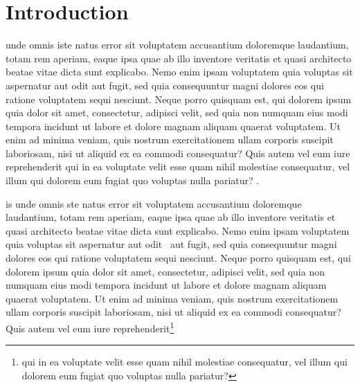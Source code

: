 \section{Introduction}
\label{sec:introduction}

 unde omnis iste natus error sit voluptatem accusantium doloremque laudantium, totam rem aperiam, eaque ipsa quae ab illo inventore veritatis et quasi architecto beatae vitae dicta sunt explicabo. Nemo enim ipsam voluptatem quia voluptas sit aspernatur aut odit aut fugit, sed quia consequuntur magni dolores eos qui ratione voluptatem sequi nesciunt. Neque porro quisquam est, qui dolorem ipsum quia dolor sit amet, consectetur, adipisci velit, sed quia non numquam eius modi tempora incidunt ut labore et dolore magnam aliquam quaerat voluptatem. Ut enim ad minima veniam, quis nostrum exercitationem ullam corporis suscipit laboriosam, nisi ut aliquid ex ea commodi consequatur? Quis autem vel eum iure reprehenderit qui in ea voluptate velit esse quam nihil molestiae consequatur, vel illum qui dolorem eum fugiat quo voluptas nulla pariatur? \cite{Gunawi:2008:SDF:1855741.1855751,
Sigurbjarnarson:2016:PVF:3026877.3026879,
Bairavasundaram:2006:LTS:1179559.1179569,
Gunawi:2008:EEH:1364813.1364827}.


is unde omnis ste natus error sit voluptatem
accusantium doloremque laudantium, totam rem aperiam, eaque ipsa quae
ab illo inventore veritatis et quasi architecto beatae vitae dicta
sunt explicabo. Nemo enim ipsam voluptatem quia voluptas sit
aspernatur aut odit~\cite{corfu} aut fugit, sed quia consequuntur magni dolores eos
qui ratione voluptatem sequi nesciunt. Neque porro quisquam est, qui
dolorem ipsum quia dolor sit amet, consectetur, adipisci velit, sed
quia non numquam eius modi tempora incidunt ut labore et dolore magnam
aliquam quaerat voluptatem. Ut enim ad minima veniam, quis nostrum
exercitationem ullam corporis suscipit laboriosam, nisi ut aliquid ex
ea commodi consequatur? Quis autem vel eum iure
reprehenderit\footnote{qui in ea voluptate velit esse quam nihil
  molestiae consequatur, vel illum qui dolorem eum fugiat quo voluptas
  nulla pariatur?}

